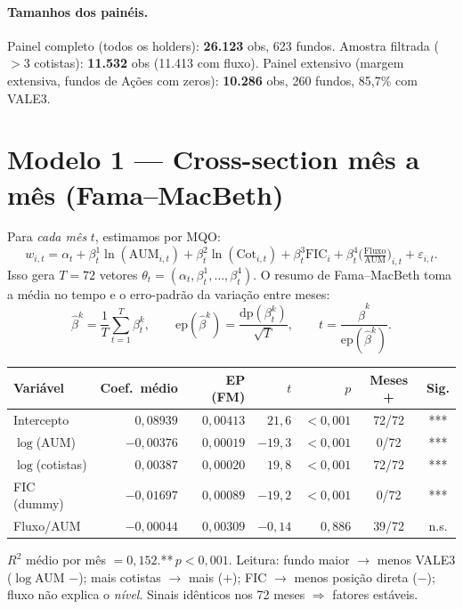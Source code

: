 \documentclass[11pt]{article}
\begin{document}
\paragraph{Tamanhos dos painéis.} Painel completo (todos os holders): \textbf{26.123}
obs, 623 fundos. Amostra filtrada ($>3$ cotistas): \textbf{11.532} obs (11.413 com
fluxo). Painel extensivo (margem extensiva, fundos de Ações com zeros): \textbf{10.286}
obs, 260 fundos, 85,7\% com VALE3.

\section{Modelo 1 — Cross-section mês a mês (Fama--MacBeth)}

Para \emph{cada mês} $t$, estimamos por MQO:
\begin{equation}
w_{i,t} = \alpha_t + \beta^{1}_t \ln(\text{AUM}_{i,t}) + \beta^{2}_t \ln(\text{Cot}_{i,t})
        + \beta^{3}_t \text{FIC}_i + \beta^{4}_t \Big(\tfrac{\text{Fluxo}}{\text{AUM}}\Big)_{i,t}
        + \varepsilon_{i,t}.
\label{eq:cs}
\end{equation}
Isso gera $T=72$ vetores $\theta_t = (\alpha_t, \beta^1_t, \dots, \beta^4_t)$. O
resumo de Fama--MacBeth toma a média no tempo e o erro-padrão da variação entre meses:
\begin{equation}
\widehat{\beta}^k = \frac{1}{T}\sum_{t=1}^{T} \beta^k_t, \qquad
\mathrm{ep}(\widehat{\beta}^k) = \frac{\mathrm{dp}(\beta^k_t)}{\sqrt{T}}, \qquad
t = \frac{\widehat{\beta}^k}{\mathrm{ep}(\widehat{\beta}^k)}.
\label{eq:fm}
\end{equation}

\begin{table}[h]\centering
\begin{tabular}{@{}lrrrrcc@{}}
\toprule
\textbf{Variável} & \textbf{Coef.\ médio} & \textbf{EP (FM)} & \textbf{$t$} & \textbf{$p$} & \textbf{Meses +} & \textbf{Sig.} \\
\midrule
Intercepto        & $0{,}08939$  & $0{,}00413$ & $21{,}6$  & $<0{,}001$ & 72/72 & *** \\
$\log$(AUM)       & $-0{,}00376$ & $0{,}00019$ & $-19{,}3$ & $<0{,}001$ & 0/72  & *** \\
$\log$(cotistas)  & $0{,}00387$  & $0{,}00020$ & $19{,}8$  & $<0{,}001$ & 72/72 & *** \\
FIC (dummy)       & $-0{,}01697$ & $0{,}00089$ & $-19{,}2$ & $<0{,}001$ & 0/72  & *** \\
Fluxo/AUM         & $-0{,}00044$ & $0{,}00309$ & $-0{,}14$ & $0{,}886$  & 39/72 & n.s. \\
\bottomrule
\end{tabular}
\end{table}
\noindent\footnotesize $R^2$ médio por mês $= 0{,}152$.\quad ***\,$p<0{,}001$.\;
Leitura: fundo maior $\to$ menos VALE3 ($\log$AUM $-$); mais cotistas $\to$ mais
($+$); FIC $\to$ menos posição direta ($-$); fluxo não explica o \emph{nível}.
Sinais idênticos nos 72 meses $\Rightarrow$ fatores estáveis. \normalsize
\end{document}
